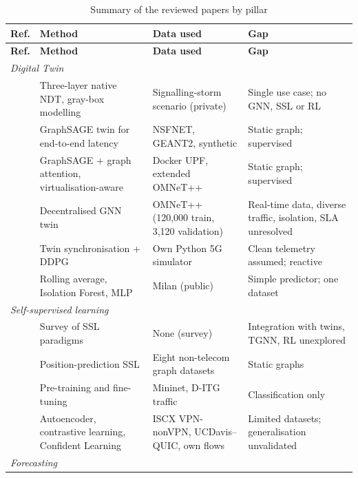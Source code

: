 {\footnotesize{}
\begin{longtable}{|p{0.9cm}|>{\raggedright\arraybackslash}p{4.8cm}|>{\raggedright\arraybackslash}p{4.7cm}|>{\raggedright\arraybackslash}p{4.5cm}|}
\caption{Summary of the reviewed papers by pillar}\label{tab:lit}\\
\hline
\textbf{Ref.} & \textbf{Method} & \textbf{Data used} & \textbf{Gap} \\ \hline
\endfirsthead
\hline
\textbf{Ref.} & \textbf{Method} & \textbf{Data used} & \textbf{Gap} \\ \hline
\endhead
\multicolumn{4}{|l|}{\textit{Digital Twin}} \\ \hline
\cite{nativendt2025} & Three-layer native NDT, gray-box modelling & Signalling-storm scenario (private) & Single use case; no GNN, SSL or RL \\ \hline
\cite{gnndt2022} & GraphSAGE twin for end-to-end latency & NSFNET, GEANT2, synthetic & Static graph; supervised \\ \hline
\cite{attentionvirt2025} & GraphSAGE + graph attention, virtualisation-aware & Docker UPF, extended OMNeT++ & Static graph; supervised \\ \hline
\cite{dte2e2023} & Decentralised GNN twin & OMNeT++ (120,000 train, 3,120 validation) & Real-time data, diverse traffic, isolation, SLA unresolved \\ \hline
\cite{ali2025} & Twin synchronisation + DDPG & Own Python 5G simulator & Clean telemetry assumed; reactive \\ \hline
\cite{selfopt2026} & Rolling average, Isolation Forest, MLP & Milan (public) & Simple predictor; one dataset \\ \hline
\multicolumn{4}{|l|}{\textit{Self-supervised learning}} \\ \hline
\cite{sslwireless2024} & Survey of SSL paradigms & None (survey) & Integration with twins, TGNN, RL unexplored \\ \hline
\cite{net2net2025} & Position-prediction SSL & Eight non-telecom graph datasets & Static graphs \\ \hline
\cite{sslsdn2022} & Pre-training and fine-tuning & Mininet, D-ITG traffic & Classification only \\ \hline
\cite{sslcl2025} & Autoencoder, contrastive learning, Confident Learning & ISCX VPN-nonVPN, UCDavis--QUIC, own flows & Limited datasets; generalisation unvalidated \\ \hline
\multicolumn{4}{|l|}{\textit{Forecasting}} \\ \hline

\end{longtable}}
